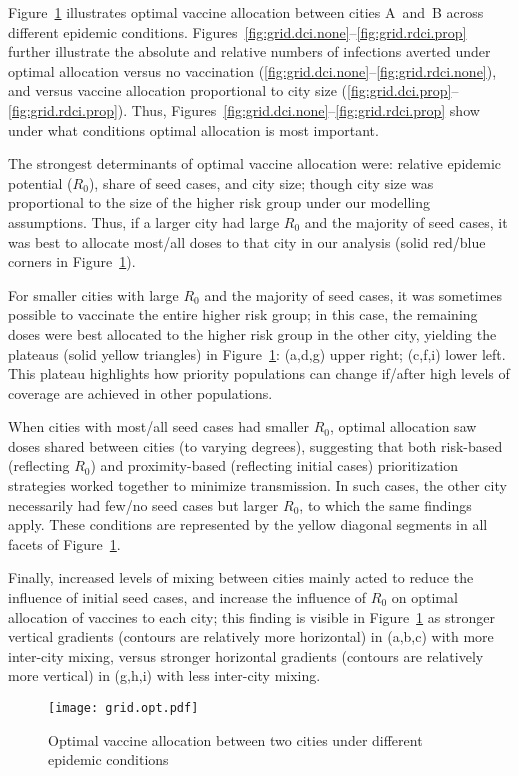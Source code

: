 \par
Figure~\ref{fig:grid.opt} illustrates optimal vaccine allocation between cities A~and~B
across different epidemic conditions.
Figures~\ref{fig:grid.dci.none}--\ref{fig:grid.rdci.prop} further illustrate the
absolute and relative numbers of infections averted under optimal allocation
versus no vaccination (\ref{fig:grid.dci.none}--\ref{fig:grid.rdci.none}), and
versus vaccine allocation proportional to city size (\ref{fig:grid.dci.prop}--\ref{fig:grid.rdci.prop}).
Thus, Figures~\ref{fig:grid.dci.none}--\ref{fig:grid.rdci.prop}
show under what conditions optimal allocation is most important.
\par
The strongest determinants of optimal vaccine allocation were:
relative epidemic potential ($R_0$), share of seed cases, and city size;
though city size was proportional to
the size of the higher risk group under our modelling assumptions.
Thus, if a larger city had large $R_0$ and the majority of seed cases,
it was best to allocate most/all doses to that city in our analysis
(solid red/blue corners in Figure~\ref{fig:grid.opt}).
\par
For smaller cities with large $R_0$ and the majority of seed cases,
it was sometimes possible to vaccinate the entire higher risk group;
in this case, the remaining doses were best allocated to the higher risk group in the other city,
yielding the plateaus (solid yellow triangles) in Figure~\ref{fig:grid.opt}:
(a,d,g) upper right; (c,f,i) lower left.
This plateau highlights how priority populations can change
if/after high levels of coverage are achieved in other populations.
\par
When cities with most/all seed cases had smaller $R_0$,
optimal allocation saw doses shared between cities (to varying degrees),
suggesting that both risk-based (reflecting $R_0$) and
proximity-based (reflecting initial cases) prioritization strategies
worked together to minimize transmission.
In such cases, the other city necessarily had few/no seed cases but larger $R_0$,
to which the same findings apply.
These conditions are represented by the yellow diagonal segments
in all facets of Figure~\ref{fig:grid.opt}.
\par
Finally, increased levels of mixing between cities
mainly acted to reduce the influence of initial seed cases,
and increase the influence of $R_0$
on optimal allocation of vaccines to each city;
this finding is visible in Figure~\ref{fig:grid.opt} as
stronger vertical gradients (contours are relatively more horizontal)
in (a,b,c) with more inter-city mixing, versus
stronger horizontal gradients (contours are relatively more vertical)
in (g,h,i) with less inter-city mixing.
\begin{figure}
  \texttt{[image: grid.opt.pdf]}
  \caption{Optimal vaccine allocation between two cities under different epidemic conditions}
  \label{fig:grid.opt}
  \floatfoot
  \gridfoot
\end{figure}
